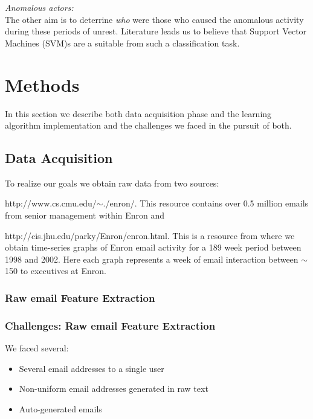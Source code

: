 \documentclass[11pt,letterpaper]{article}
\begin{document}
\textit{Anomalous actors:} \\
The other aim is to deterrine \textit{who} were those who caused the anomalous
activity during these periods of unrest. Literature \cite{shon2007hybrid,shon2005machine}
leads us to believe that Support Vector Machines (SVM)s are a suitable from such 
a classification task. 


\section{Methods}
In this section we describe both data acquisition phase and the learning algorithm
implementation and the challenges we faced in the pursuit of both.

\subsection{Data Acquisition}
To realize our goals we obtain raw data from two sources:
\begin{inparaenum}[\itshape(i)]
\item http://www.cs.cmu.edu/$\sim$./enron/. This resource contains over 0.5 million
emails from senior management within Enron and 
\item http://cis.jhu.edu/parky/Enron/enron.html. This is a resource from where we obtain
time-series graphs of Enron email activity for a 189 week period between 1998 and 2002.
Here each graph represents a week of email interaction between $\sim$150 to executives
at Enron.
\end{inparaenum}

\subsubsection{Raw email Feature Extraction}

\subsubsection{Challenges: Raw email Feature Extraction}
We faced several:

\begin{itemize}
\item Several email addresses to a single user
\item Non-uniform email addresses generated in raw text
\item Auto-generated emails
\end{itemize}
\end{document}

